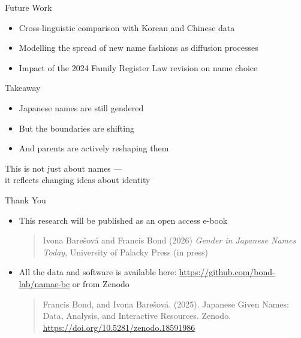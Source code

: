 \documentclass{beamer}
\begin{document}
\begin{frame}{Future Work}
  \begin{itemize}
    \item Cross-linguistic comparison with Korean and Chinese data
    \item Modelling the spread of new name fashions as diffusion processes
    \item Impact of the 2024 Family Register Law revision on name choice
  \end{itemize}
\end{frame}

\begin{frame}{Takeaway}
  \begin{itemize}
    \item Japanese names are still gendered
    \item But the boundaries are shifting
    \item And parents are actively reshaping them
  \end{itemize}
  \vspace{1em}
  \pause
  \begin{center}
    \Large This is not just about names ---\\
    it reflects changing ideas about identity
  \end{center}
\end{frame}

\begin{frame}{Thank You}
  \begin{center}
    \Large {}
  \end{center}
  
    \begin{itemize}
    \item This research will be published as an open access e-book 
      \begin{quote}
        Ivona Barešová and Francis Bond (2026) \textit{Gender in Japanese Names Today},  University of Palacky Press (in press)
      \end{quote}
    \item All the data and software is available here: \url{https://github.com/bond-lab/namae-bc} or from Zenodo
      \begin{quote}
        Francis Bond, and Ivona Barešová. (2025). Japanese Given Names: Data, Analysis, and Interactive Resources. Zenodo. \url{https://doi.org/10.5281/zenodo.18591986}
      \end{quote}
    \end{itemize}
  \end{frame}
\end{document}
